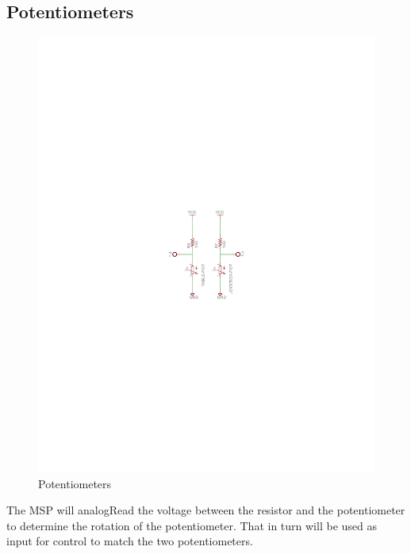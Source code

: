 \documentclass[a4paper, 11pt]{article}
\begin{document}
	\subsection{Potentiometers}
	\begin{figure}[!ht]
		\centering
		\vspace{-11cm}
		\includegraphics{report-images/potentiometers}
		\vspace{-11.25cm}
		\caption{Potentiometers}
	\end{figure}
	\noindent The MSP will analogRead the voltage between the resistor and the potentiometer to determine the rotation of the potentiometer.  That in turn will be used as input for control to match the two potentiometers.  
\end{document}
